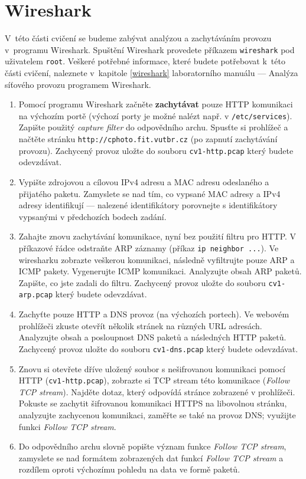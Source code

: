 \section{Wireshark}
V~této části cvičení se budeme zabývat analýzou a zachytáváním provozu
v~programu Wireshark. Spuštění Wireshark provedete příkazem \texttt{wireshark}
pod uživatelem \texttt{root}. Veškeré potřebné informace, které budete
potřebovat k~této části cvičení, naleznete v~kapitole \ref{wireshark} laboratorního manuálu
--- Analýza síťového provozu programem Wireshark.

\begin{enumerate}
  \item Pomocí programu Wireshark začněte \textbf{zachytávat} pouze HTTP komunikaci na výchozím portě (výchozí porty je možné nalézt např. v \texttt{/etc/services}).
    Zapište použitý \emph{capture filter} do odpovědního archu.
    Spusťte si prohlížeč a načtěte stránku \texttt{http://cphoto.fit.vutbr.cz} (po zapnutí zachytávání provozu).
    Zachycený provoz uložte do souboru \texttt{cv1-http.pcap} který budete odevzdávat.
\item Vypište zdrojovou a cílovou IPv4 adresu a MAC adresu odeslaného a přijatého paketu.
  Zamyslete se nad tím, co vypsané MAC adresy a IPv4 adresy identifikují --- nalezené identifikátory porovnejte s identifikátory vypsanými v předchozích bodech zadání.
\item Zahajte znovu zachytávání komunikace, nyní bez použití filtru pro HTTP.
  V příkazové řádce odstraňte ARP záznamy (příkaz \texttt{ip neighbor ...}).
  Ve wiresharku zobrazte veškerou komunikaci, následně vyfiltrujte pouze ARP a ICMP pakety.
  Vygenerujte ICMP komunikaci.
  Analyzujte obsah ARP paketů.
  Zapište, co jste zadali do filtru.
  Zachycený provoz uložte do souboru \texttt{cv1-arp.pcap} který budete odevzdávat.
\item Zachyťte pouze HTTP a DNS provoz (na výchozích portech).
  Ve webovém prohlížeči zkuste otevřít několik stránek na různých URL adresách.
  Analyzujte obsah a posloupnost DNS paketů a následných HTTP paketů.
  Zachycený provoz uložte do souboru \texttt{cv1-dns.pcap} který budete odevzdávat.
\item Znovu si otevřete dříve uložený soubor s nešifrovanou komunikaci pomocí HTTP (\texttt{cv1-http.pcap}), zobrazte si TCP stream této komunikace (\emph{Follow TCP stream}).
  Najděte dotaz, který odpovídá stránce zobrazené v prohlížeči.
  Pokuste se zachytit šifrovanou komunikaci HTTPS na libovolnou stránku, analyzujte zachycenou komunikaci, zaměřte se také na provoz DNS; využijte funkci \emph{Follow TCP stream}.
\item Do odpovědního archu slovně popište význam funkce \emph{Follow TCP stream}, zamyslete se nad formátem zobrazených dat funkcí \emph{Follow TCP stream} a rozdílem oproti výchozímu pohledu na data ve formě paketů.
\end{enumerate}

